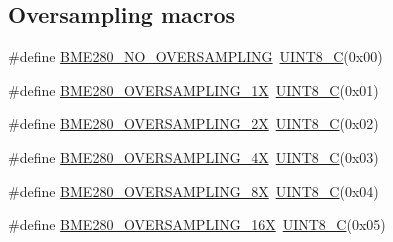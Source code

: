 \subsection*{Oversampling macros}
\begin{DoxyCompactItemize}
\item 
\#define \hyperlink{group___b_m_e280_ga58004a62b46ed7bcdb8d73ad4fa8cbc1}{B\+M\+E280\+\_\+\+N\+O\+\_\+\+O\+V\+E\+R\+S\+A\+M\+P\+L\+I\+NG}~\hyperlink{group___b_m_e280_gacd2aa09844a8a245cf7fdbb808e215e5}{U\+I\+N\+T8\+\_\+C}(0x00)
\item 
\#define \hyperlink{group___b_m_e280_ga701285fd2495e391411b694c9b50c08a}{B\+M\+E280\+\_\+\+O\+V\+E\+R\+S\+A\+M\+P\+L\+I\+N\+G\+\_\+1X}~\hyperlink{group___b_m_e280_gacd2aa09844a8a245cf7fdbb808e215e5}{U\+I\+N\+T8\+\_\+C}(0x01)
\item 
\#define \hyperlink{group___b_m_e280_ga59a76b60316ed9a11ac552085f33603c}{B\+M\+E280\+\_\+\+O\+V\+E\+R\+S\+A\+M\+P\+L\+I\+N\+G\+\_\+2X}~\hyperlink{group___b_m_e280_gacd2aa09844a8a245cf7fdbb808e215e5}{U\+I\+N\+T8\+\_\+C}(0x02)
\item 
\#define \hyperlink{group___b_m_e280_ga521eb8ad23776eee8faaf58b17191a76}{B\+M\+E280\+\_\+\+O\+V\+E\+R\+S\+A\+M\+P\+L\+I\+N\+G\+\_\+4X}~\hyperlink{group___b_m_e280_gacd2aa09844a8a245cf7fdbb808e215e5}{U\+I\+N\+T8\+\_\+C}(0x03)
\item 
\#define \hyperlink{group___b_m_e280_ga7b3d9cb65ee6dfef65bc1982865c5a90}{B\+M\+E280\+\_\+\+O\+V\+E\+R\+S\+A\+M\+P\+L\+I\+N\+G\+\_\+8X}~\hyperlink{group___b_m_e280_gacd2aa09844a8a245cf7fdbb808e215e5}{U\+I\+N\+T8\+\_\+C}(0x04)
\item 
\#define \hyperlink{group___b_m_e280_gad8dc54a7a7d5bd1fd04d901561f7f646}{B\+M\+E280\+\_\+\+O\+V\+E\+R\+S\+A\+M\+P\+L\+I\+N\+G\+\_\+16X}~\hyperlink{group___b_m_e280_gacd2aa09844a8a245cf7fdbb808e215e5}{U\+I\+N\+T8\+\_\+C}(0x05)
\end{DoxyCompactItemize}
